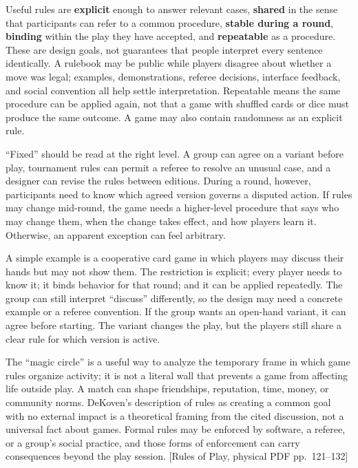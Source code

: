 Useful rules are \textbf{explicit} enough to answer relevant cases, \textbf{shared} in the sense that participants can refer to a common procedure, \textbf{stable during a round}, \textbf{binding} within the play they have accepted, and \textbf{repeatable} as a procedure. These are design goals, not guarantees that people interpret every sentence identically. A rulebook may be public while players disagree about whether a move was legal; examples, demonstrations, referee decisions, interface feedback, and social convention all help settle interpretation. Repeatable means the same procedure can be applied again, not that a game with shuffled cards or dice must produce the same outcome. A game may also contain randomness as an explicit rule.

``Fixed'' should be read at the right level. A group can agree on a variant before play, tournament rules can permit a referee to resolve an unusual case, and a designer can revise the rules between editions. During a round, however, participants need to know which agreed version governs a disputed action. If rules may change mid-round, the game needs a higher-level procedure that says who may change them, when the change takes effect, and how players learn it. Otherwise, an apparent exception can feel arbitrary.

A simple example is a cooperative card game in which players may discuss their hands but may not show them. The restriction is explicit; every player needs to know it; it binds behavior for that round; and it can be applied repeatedly. The group can still interpret ``discuss'' differently, so the design may need a concrete example or a referee convention. If the group wants an open-hand variant, it can agree before starting. The variant changes the play, but the players still share a clear rule for which version is active.

The ``magic circle'' is a useful way to analyze the temporary frame in which game rules organize activity; it is not a literal wall that prevents a game from affecting life outside play. A match can shape friendships, reputation, time, money, or community norms. DeKoven's description of rules as creating a common goal with no external impact is a theoretical framing from the cited discussion, not a universal fact about games. Formal rules may be enforced by software, a referee, or a group's social practice, and those forms of enforcement can carry consequences beyond the play session. {[}Rules of Play, physical PDF pp.~121--132{]}

